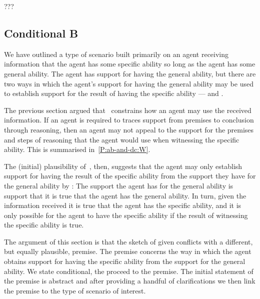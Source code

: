 \begin{note}[Summarising]
  ???
\end{note}

\subsection{Conditional B}
\label{sec:second-conditional}

\begin{note}
  We have outlined a type of scenario built primarily on an agent receiving information that the agent has some specific ability so long as the agent has some general ability.
  The agent has support for having the general ability, but there are two ways in which the agent's support for having the general ability may be used to establish support for {\color{red} the result of having the specific ability} --- \AR{} and \WR{}.

  The previous section argued that~\uRa{} constrains how an agent may use the received information.
  If an agent is required to traces support from premises to conclusion through reasoning, then an agent may not appeal to the support for the premises and steps of reasoning that the agent would use when witnessing the specific ability.
  {\color{red} This is summarised in~\ref{P:ab-and-dc:W}.}

  The (initial) plausibility of~\uRa{}, then, suggests that the agent may only establish support for having the {\color{red} result of the specific ability} from the support they have for the general ability by \AR{}:
  The support the agent has for the general ability is support that it is true that the agent has the general ability.
  In turn, given the information received it is true that the agent has the specific ability, and it is only possible for the agent to have the specific ability if the result of witnessing the specific ability is true.

  The argument of this section is that the sketch of \AR{} given conflicts with a different, but equally plausible, premise.
  The premise concerns the way in which the agent obtains support for having the specific ability from the support for the general ability.
  We state conditional, the proceed to the premise.
  The initial statement of the premise is abstract and after providing a handful of clarifications we then link the premise to the type of scenario of interest.
\end{note}

